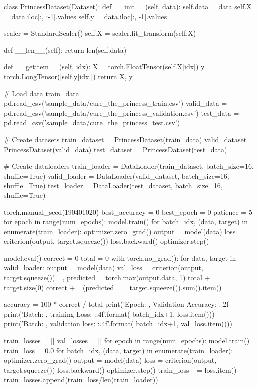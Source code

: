 \documentclass[11pt]{article}
\begin{document}
\begin{python}
class PrincessDataset(Dataset):
    def __init__(self, data):
        self.data = data
        self.X = data.iloc[:, :-1].values
        self.y = data.iloc[:, -1].values

        scaler = StandardScaler()
        self.X = scaler.fit_transform(self.X)

    def __len__(self):
        return len(self.data)

    def __getitem__(self, idx):
        X = torch.FloatTensor(self.X[idx])
        y = torch.LongTensor([self.y[idx]])
        return X, y


# Load data
train_data = pd.read_csv('sample_data/cure_the_princess_train.csv')
valid_data = pd.read_csv('sample_data/cure_the_princess_validation.csv')
test_data = pd.read_csv('sample_data/cure_the_princess_test.csv')

# Create datasets
train_dataset = PrincessDataset(train_data)
valid_dataset = PrincessDataset(valid_data)
test_dataset = PrincessDataset(test_data)

# Create dataloaders
train_loader = DataLoader(train_dataset, batch_size=16, shuffle=True)
valid_loader = DataLoader(valid_dataset, batch_size=16, shuffle=True)
test_loader = DataLoader(test_dataset, batch_size=16, shuffle=True)

torch.manual_seed(190401020)
best_accuracy = 0
best_epoch = 0
patience = 5
for epoch in range(num_epochs):
    model.train()
    for batch_idx, (data, target) in enumerate(train_loader):
        optimizer.zero_grad()
        output = model(data)
        loss = criterion(output, target.squeeze())
        loss.backward()
        optimizer.step()

    model.eval()
    correct = 0
    total = 0
    with torch.no_grad():
        for data, target in valid_loader:
            output = model(data)
            val_loss = criterion(output, target.squeeze())
            _, predicted = torch.max(output.data, 1)
            total += target.size(0)
            correct += (predicted == target.squeeze()).sum().item()
    
    accuracy = 100 * correct / total
    print('Epoch: {}, Validation Accuracy: {:.2f}%
    print('Batch: {}, training Loss: {:.4f}'.format( batch_idx+1, loss.item()))
    print('Batch: {}, validation loss: {:.4f}'.format( batch_idx+1, val_loss.item()))
   
train_losses = []
val_losses = []
for epoch in range(num_epochs):
    model.train()
    train_loss = 0.0
    for batch_idx, (data, target) in enumerate(train_loader):
        optimizer.zero_grad()
        output = model(data)
        loss = criterion(output, target.squeeze())
        loss.backward()
        optimizer.step()
        train_loss += loss.item()
    train_losses.append(train_loss/len(train_loader))


\end{python}
\end{document}
